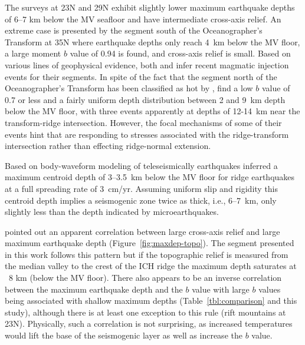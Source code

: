 \documentclass[aguplus]{aguplus}
\newlength{\tw}
\begin{document}
\begin{article}
The surveys at 23\dg N \citep{kong92} and 29\dg N \citep{wolfe95}
exhibit slightly lower maximum earthquake depths of 6--7 km below the
MV seafloor and have intermediate cross-axis relief.  An extreme case is
presented by the segment south of the Oceanographer's Transform at 35\dg N \citep{barclay01} where earthquake
depths only reach 4~km below the MV floor, a
large moment $b$ value of 0.94 is found, and cross-axis relief is small.
Based on
various lines of geophysical evidence, both
\citet{kong92} and \citet{barclay01} infer recent magmatic injection
events for their segments.
In spite of the fact that the segment north of the
Oceanographer's Transform has been classified as hot by
\citet{thibaud98}, \citet{cessaro86} find a low $b$ value of 0.7 or
less and a fairly uniform depth
distribution between 2 and 9~km depth below the MV floor, with three
events apparently at depths of 12-14~km near the transform-ridge intersection.
However, the focal mechanisms of some of their events hint that
are responding to stresses associated with the ridge-transform
intersection rather than effecting ridge-normal extension.

Based on body-waveform modeling of teleseismically  earthquakes
\citet{huang88} inferred a maximum centroid depth of 3--3.5~km below
the MV floor for ridge earthquakes at a full spreading rate of
3~cm/yr. Assuming uniform slip and rigidity this centroid depth
implies a seismogenic zone twice as thick, i.e., 6--7~km, only
slightly less than the depth indicated by microearthquakes.

\citet{barclay01} pointed out an apparent correlation between
large cross-axis relief and large maximum earthquake depth
(Figure~\ref{fig:maxdep-topo}).  The segment presented in this work
follows this pattern but if the topographic relief is measured
from the median valley to the crest of the ICH ridge the maximum depth
saturates at ~8 km (below the MV floor).
There also appears to be an inverse correlation
between the maximum earthquake depth and the $b$ value with
large $b$ values being associated with shallow maximum depths
(Table~\ref{tbl:comparison} and this study),
although there is at least one exception to this rule (rift mountains
at 23\dg N).  Physically, such a correlation is not surprising, as
increased temperatures would lift the base of the seismogenic
layer as well as increase the $b$ value.


\end{article}
\end{document}

